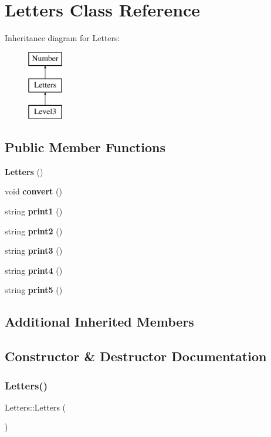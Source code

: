 \section{Letters Class Reference}
\label{class_letters}
Inheritance diagram for Letters\+:\begin{figure}[H]
\begin{center}
\leavevmode
\includegraphics[height=3.000000cm]{class_letters}
\end{center}
\end{figure}
\subsection*{Public Member Functions}
\begin{DoxyCompactItemize}
\item 
\textbf{ Letters} ()
\item 
void \textbf{ convert} ()
\item 
string \textbf{ print1} ()
\item 
string \textbf{ print2} ()
\item 
string \textbf{ print3} ()
\item 
string \textbf{ print4} ()
\item 
string \textbf{ print5} ()
\end{DoxyCompactItemize}
\subsection*{Additional Inherited Members}


\subsection{Constructor \& Destructor Documentation}
\mbox{\label{class_letters_a2760d4b695fcd6e35bc3af8e3cccaec0}} 
\subsubsection{Letters()}
{\footnotesize\ttfamily Letters\+::\+Letters (\begin{DoxyParamCaption}{ }\end{DoxyParamCaption})\hspace{0.3cm}{\ttfamily [inline]}}



